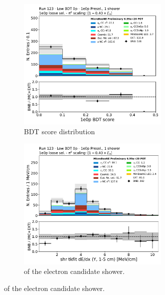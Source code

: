 \begin{figure}[H]
    \centering
    \begin{subfigure}{0.3\textwidth}
    \includegraphics[width=0.8\textwidth]{1e0p/Low_BDT_Sideband/loose_selection/bkg_score_low_bdt.pdf}
    \caption{BDT score distribution}
    \end{subfigure}
    \begin{subfigure}{0.3\textwidth}
    \includegraphics[width=0.8\textwidth]{1e0p/Low_BDT_Sideband/loose_selection/shr_tkfit_gap10_dedx_Y.pdf}
    \caption{\dedx of the electron candidate shower.}

\end{subfigure}
\end{figure}
